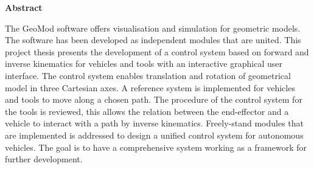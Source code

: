 \vspace*{\fill}
{\centering\huge\bfseries Abstract \par}

\noindent The GeoMod software offers visualisation and simulation for geometric models. The software has been developed as independent modules that are united. This project thesis presents the development of a control system based on forward and inverse kinematics for vehicles and tools with an interactive graphical user interface. The control system enables translation and rotation of geometrical model in three Cartesian axes. A reference system is implemented for vehicles and tools to move along a chosen path. The procedure of the control system for the tools is reviewed, this allows the relation between the end-effector and a vehicle to interact with a path by inverse kinematics. Freely-stand modules that are implemented is addressed to design a unified control system for autonomous vehicles. The goal is to have a comprehensive system working as a framework for further development.

\vspace*{\fill}